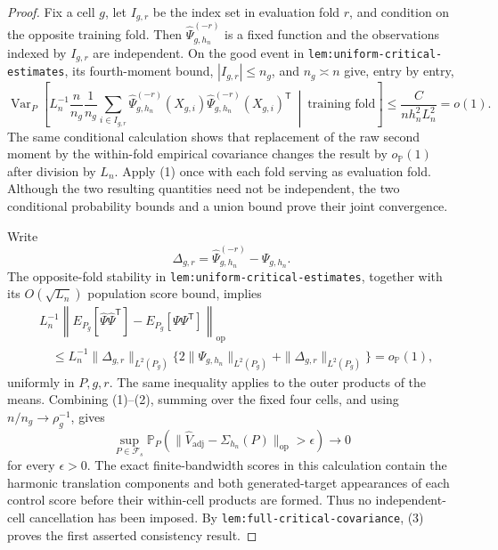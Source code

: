 \documentclass{article}
\begin{document}
\begin{proof}
Fix a cell \(g\), let \(I_{g,r}\) be the index set in evaluation fold \(r\), and condition on the opposite training fold.  Then \(\widehat\Psi_{g,h_n}^{(-r)}\) is a fixed function and the observations indexed by \(I_{g,r}\) are independent.  On the good event in \texttt{lem:uniform-critical-estimates}, its fourth-moment bound, \(|I_{g,r}|\leq n_g\), and \(n_g\asymp n\) give, entry by entry,
\[
 \operatorname{Var}_P\!\left[
 L_n^{-1}\frac n{n_g}\frac1{n_g}
 \sum_{i\in I_{g,r}}
 \widehat\Psi_{g,h_n}^{(-r)}(X_{g,i})
 \widehat\Psi_{g,h_n}^{(-r)}(X_{g,i})^{\mathsf T}
 \ \middle|\ \text{training fold}\right]
 \leq\frac{C}{nh_n^2L_n^2}=o(1).                                     \tag{1}
\]
The same conditional calculation shows that replacement of the raw second moment by the within-fold empirical covariance changes the result by \(o_{\mathbb P}(1)\) after division by \(L_n\).  Apply (1) once with each fold serving as evaluation fold.  Although the two resulting quantities need not be independent, the two conditional probability bounds and a union bound prove their joint convergence.

Write
\[
 \Delta_{g,r}=\widehat\Psi_{g,h_n}^{(-r)}-\Psi_{g,h_n}.
\]
The opposite-fold stability in \texttt{lem:uniform-critical-estimates}, together with its \(O(\sqrt{L_n})\) population score bound, implies
\[
 \begin{aligned}
 &L_n^{-1}\left\|
 E_{P_g}[\widehat\Psi\widehat\Psi^{\mathsf T}]
 -E_{P_g}[\Psi\Psi^{\mathsf T}]
 \right\|_{\mathrm{op}}\\
 &\quad\leq L_n^{-1}\|\Delta_{g,r}\|_{L^2(P_g)}
 \{2\|\Psi_{g,h_n}\|_{L^2(P_g)}+\|\Delta_{g,r}\|_{L^2(P_g)}\}
 =o_{\mathbb P}(1),                                                    \tag{2}
 \end{aligned}
\]
uniformly in \(P,g,r\).  The same inequality applies to the outer products of the means.  Combining (1)--(2), summing over the fixed four cells, and using \(n/n_g\to\rho_g^{-1}\), gives
\[
 \sup_{P\in\mathcal F_s}
 \mathbb P_P\!\left(
 \|\widehat V_{\mathrm{adj}}-\Sigma_{h_n}(P)\|_{\mathrm{op}}>\epsilon
 \right)\longrightarrow0                                             \tag{3}
\]
for every \(\epsilon>0\).  The exact finite-bandwidth scores in this calculation contain the harmonic translation components and both generated-target appearances of each control score before their within-cell products are formed.  Thus no independent-cell cancellation has been imposed.  By \texttt{lem:full-critical-covariance}, (3) proves the first asserted consistency result.


\end{proof}
\end{document}
